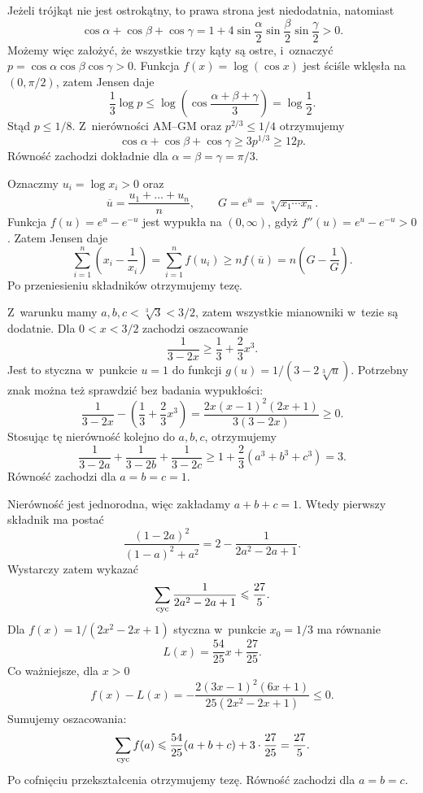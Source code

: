 \documentclass{lecture-kuznia}
\begin{document}
\begin{solution*}[\ref{ZKatyCosinusy}]
	Jeżeli trójkąt nie jest ostrokątny, to prawa strona jest niedodatnia,
	natomiast
	\[
		\cos\alpha+\cos\beta+\cos\gamma
		=1+4\sin\frac\alpha2\sin\frac\beta2\sin\frac\gamma2>0.
	\]
	Możemy więc założyć, że wszystkie trzy kąty są ostre, i~oznaczyć
	$p=\cos\alpha\cos\beta\cos\gamma>0$. Funkcja
	$f(x)=\log(\cos x)$ jest ściśle wklęsła na $(0,\pi/2)$, zatem Jensen
	daje
	\[
		\frac13\log p
		\leqslant
		\log\left(\cos\frac{\alpha+\beta+\gamma}{3}\right)
		=\log\frac12.
	\]
	Stąd $p\leqslant1/8$. Z~nierówności AM--GM oraz
	$p^{2/3}\leqslant1/4$ otrzymujemy
	\[
		\cos\alpha+\cos\beta+\cos\gamma
		\geqslant3p^{1/3}
		\geqslant12p.
	\]
	Równość zachodzi dokładnie dla
	$\alpha=\beta=\gamma=\pi/3$.
\end{solution*}

\begin{solution*}[\ref{Z11}]
	Oznaczmy $u_i=\log x_i>0$ oraz
	\[
		\overline u=\frac{u_1+\dots+u_n}{n},
		\qquad G=e^{\overline u}=\sqrt[n]{x_1\cdots x_n}.
	\]
	Funkcja $f(u)=e^u-e^{-u}$ jest wypukła na $(0,\infty)$, gdyż
	$f''(u)=e^u-e^{-u}>0$. Zatem Jensen daje
	\[
		\sum_{i=1}^n\left(x_i-\frac1{x_i}\right)
		=\sum_{i=1}^n f(u_i)
		\geqslant nf(\overline u)
		=n\left(G-\frac1G\right).
	\]
	Po przeniesieniu składników otrzymujemy tezę.
\end{solution*}

\begin{solution*}[\ref{Z10}]
	Z~warunku mamy $a,b,c<\sqrt[3]{3}<3/2$, zatem wszystkie mianowniki
	w~tezie są dodatnie. Dla $0<x<3/2$ zachodzi oszacowanie
	\[
		\frac1{3-2x}\geqslant\frac13+\frac23x^3.
	\]
	Jest to styczna w~punkcie $u=1$ do funkcji
	$g(u)=1/(3-2\sqrt[3]{u})$. Potrzebny znak można też sprawdzić bez
	badania wypukłości:
	\[
		\frac1{3-2x}-\left(\frac13+\frac23x^3\right)
		=\frac{2x(x-1)^2(2x+1)}{3(3-2x)}\geqslant0.
	\]
	Stosując tę nierówność kolejno do $a,b,c$, otrzymujemy
	\[
		\frac1{3-2a}+\frac1{3-2b}+\frac1{3-2c}
		\geqslant1+\frac23(a^3+b^3+c^3)=3.
	\]
	Równość zachodzi dla $a=b=c=1$.
\end{solution*}

\begin{solution*}[\ref{Z14}]
	Nierówność jest jednorodna, więc zakładamy $a+b+c=1$. Wtedy pierwszy
	składnik ma postać
	\[
		\frac{(1-2a)^2}{(1-a)^2+a^2}
		=2-\frac1{2a^2-2a+1}.
	\]
	Wystarczy zatem wykazać
	\[
		\sum_{\rm cyc}\frac1{2a^2-2a+1}\leqslant\frac{27}{5}.
	\]
	Dla $f(x)=1/(2x^2-2x+1)$ styczna w~punkcie $x_0=1/3$ ma równanie
	\[
		L(x)=\frac{54}{25}x+\frac{27}{25}.
	\]
	Co ważniejsze, dla $x>0$
	\[
		f(x)-L(x)
		=-\frac{2(3x-1)^2(6x+1)}{25(2x^2-2x+1)}\leqslant0.
	\]
	Sumujemy oszacowania:
	\[
		\sum_{\rm cyc}f(a)
		\leqslant\frac{54}{25}(a+b+c)+3\cdot\frac{27}{25}
		=\frac{27}{5}.
	\]
	Po cofnięciu przekształcenia otrzymujemy tezę. Równość zachodzi dla
	$a=b=c$.
\end{solution*}
\end{document}
